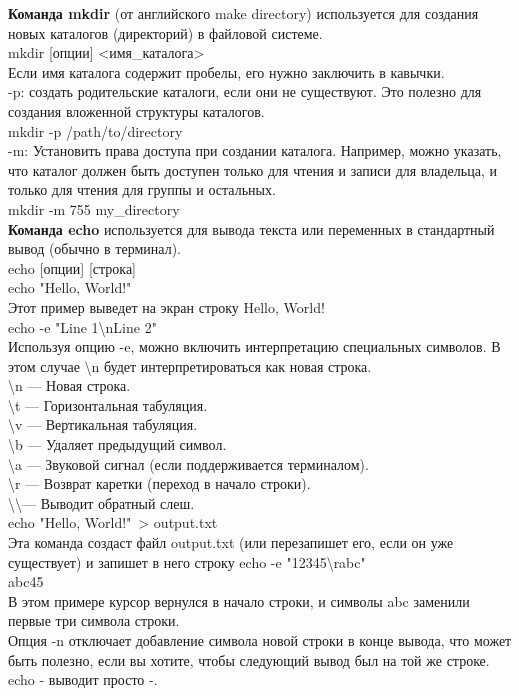 \noindent \textbf{Команда mkdir} (от английского make directory) используется для создания новых каталогов (директорий) в файловой системе. \\
mkdir [опции] <имя\_каталога> \\
Если имя каталога содержит пробелы, его нужно заключить в кавычки. \\
-p: создать родительские каталоги, если они не существуют. Это полезно для создания вложенной структуры каталогов. \\
mkdir -p /path/to/directory \\
-m: Установить права доступа при создании каталога. Например, можно указать, что каталог должен быть доступен только для чтения и записи для владельца, и только для чтения для группы и остальных. \\
mkdir -m 755 my\_directory \\

\noindent \textbf{Команда echo} используется для вывода текста или переменных в стандартный вывод (обычно в терминал). \\
echo [опции] [строка] \\
echo "Hello, World!" \\
Этот пример выведет на экран строку Hello, World! \\
echo -e "Line 1\textbackslash nLine 2" \\
Используя опцию -e, можно включить интерпретацию специальных символов. В этом случае \textbackslash n будет интерпретироваться как новая строка. \\
\textbackslash n — Новая строка. \\
\textbackslash t — Горизонтальная табуляция. \\
\textbackslash v — Вертикальная табуляция. \\
\textbackslash b — Удаляет предыдущий символ. \\
\textbackslash a — Звуковой сигнал (если поддерживается терминалом). \\
\textbackslash r — Возврат каретки (переход в начало строки). \\
\textbackslash \textbackslash — Выводит обратный слеш. \\
echo "Hello, World!"\ > output.txt \\
Эта команда создаст файл output.txt (или перезапишет его, если он уже существует) и запишет в него строку 
echo -e "12345\textbackslash rabc" \\
abc45 \\
В этом примере курсор вернулся в начало строки, и символы abc заменили первые три символа строки. \\
Опция -n отключает добавление символа новой строки в конце вывода, что может быть полезно, если вы хотите, чтобы следующий вывод был на той же строке. \\
echo - выводит просто -.\\

